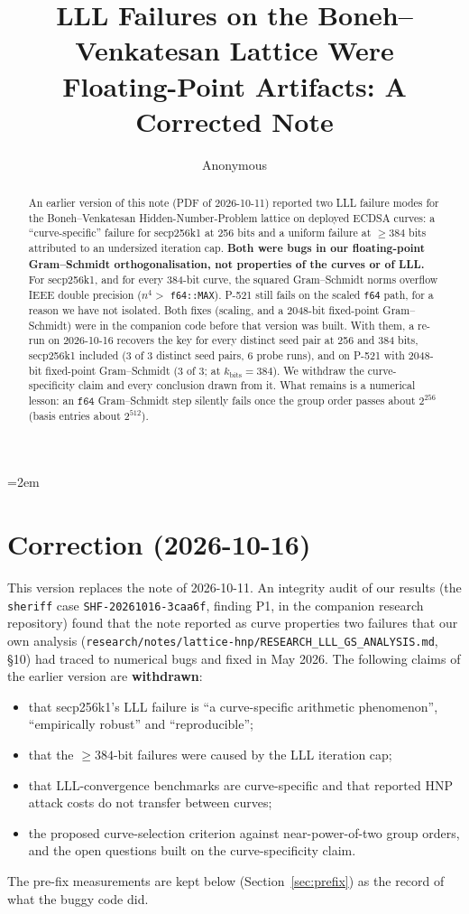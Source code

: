 \documentclass[10pt,a4paper]{article}
\title{LLL Failures on the Boneh--Venkatesan Lattice Were\\
       Floating-Point Artifacts: A Corrected Note}
\author{Anonymous}
\date{}
\begin{document}
\maketitle
\emergencystretch=2em

\begin{abstract}
An earlier version of this note (PDF of 2026-10-11) reported two LLL
failure modes for the Boneh--Venkatesan Hidden-Number-Problem lattice
on deployed ECDSA curves: a ``curve-specific'' failure for secp256k1
at 256 bits and a uniform failure at $\geq 384$ bits attributed to an
undersized iteration cap. \textbf{Both were bugs in our floating-point
Gram--Schmidt orthogonalisation, not properties of the curves or of
LLL.} For secp256k1, and for every 384-bit curve, the squared
Gram--Schmidt norms overflow IEEE double precision ($n^4 >$
\texttt{f64::MAX}). P-521 still fails on the scaled \texttt{f64}
path, for a reason we have not isolated. Both fixes (scaling, and a
2048-bit fixed-point Gram--Schmidt) were in the companion code before
that version was built. With them, a re-run on 2026-10-16 recovers the
key for every distinct seed pair at 256 and 384 bits, secp256k1
included (3 of 3 distinct seed pairs, 6 probe runs), and on P-521 with
2048-bit fixed-point Gram--Schmidt (3 of 3; at
$k_{\text{bits}} = 384$). We withdraw the curve-specificity claim and every conclusion
drawn from it. What remains is a numerical lesson: an
$\texttt{f64}$ Gram--Schmidt step silently fails once the group order
passes about $2^{256}$ (basis entries about $2^{512}$).
\end{abstract}

\section*{Correction (2026-10-16)}

This version replaces the note of 2026-10-11. An integrity audit of
our results (the \texttt{sheriff} case \texttt{SHF-20261016-3caa6f},
finding P1, in the companion research repository) found that the note
reported as curve properties two failures that our own analysis
(\nolinkurl{research/notes/lattice-hnp/RESEARCH_LLL_GS_ANALYSIS.md},
\S10) had traced to numerical bugs and fixed in May 2026. The
following claims of the earlier version are \textbf{withdrawn}:
\begin{itemize}
\item that secp256k1's LLL failure is ``a curve-specific arithmetic
      phenomenon'', ``empirically robust'' and ``reproducible'';
\item that the $\geq 384$-bit failures were caused by the LLL iteration
      cap;
\item that LLL-convergence benchmarks are curve-specific and that
      reported HNP attack costs do not transfer between curves;
\item the proposed curve-selection criterion against
      near-power-of-two group orders, and the open questions built on
      the curve-specificity claim.
\end{itemize}
The pre-fix measurements are kept below (Section~\ref{sec:prefix}) as
the record of what the buggy code did.
\end{document}
